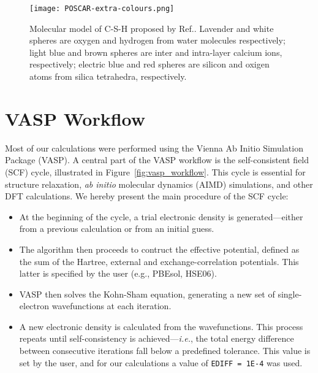 \begin{figure}[h]
    \centering
    \texttt{[image: POSCAR-extra-colours.png]}
    \caption{Molecular model of C-S-H proposed by Ref.\supercite{Pellenq2009}. Lavender and white spheres are oxygen and hydrogen from  water molecules respectively; light blue and brown spheres are inter and intra-layer calcium ions, respectively; electric blue and red spheres are silicon and oxigen atoms from silica tetrahedra, respectively.}
    \label{fig:csh_structure}
\end{figure}

\section{VASP Workflow}
Most of our calculations were performed using the Vienna Ab Initio Simulation Package (VASP).  A central part of the VASP workflow is the self-consistent field (SCF) cycle, illustrated in Figure~\ref{fig:vasp_workflow}. This cycle is essential for structure relaxation, \emph{ab initio} molecular dynamics (AIMD) simulations, and other DFT calculations. We hereby present the main procedure of the SCF cycle:

\begin{itemize}
    \item At the beginning of the cycle, a trial electronic density is generated---either from a previous calculation or from an initial guess. 
    \item The algorithm then proceeds to contruct the effective potential, defined as the sum of the Hartree, external and exchange-correlation potentials. This latter is specified by the user (e.g., PBEsol, HSE06).
    \item VASP then solves the Kohn-Sham equation, generating a new set of single-electron wavefunctions at each iteration. 
    \item A new electronic density is calculated from the wavefunctions. This process repeats until self-consistency is achieved---\emph{i.e.}, the total energy difference between consecutive iterations fall below a predefined tolerance. This value is set by the user, and for our calculations a value of \texttt{EDIFF = 1E-4} was used. 
\end{itemize}




